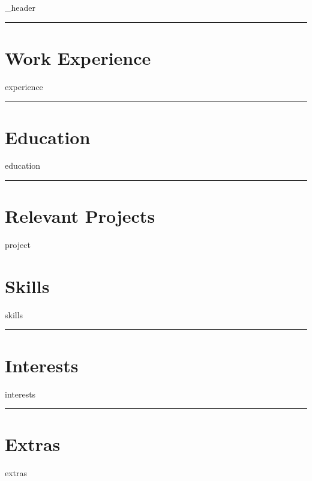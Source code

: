 \documentclass[letter,10pt]{article}
\author{Guilherme Lopes}
\begin{document}
{_header}
\vspace*{10pt}
\hrule


\section{\textbf{Work Experience}}
{experience}
\vspace*{6pt}
\hrule
\section{\textbf{Education}}
{education}
\vspace*{6pt}
\hrule

\section{\textbf{Relevant Projects}}
\vspace*{3pt}
{project}
\vspace*{6pt}

\section{\textbf{Skills}}
\vspace*{3pt}
{skills}
\vspace*{6pt}
\hrule

\section{\textbf{Interests}}
\vspace*{3pt}
{interests}
\vspace*{12pt}
\hrule

\section{\textbf{Extras}}
\vspace*{3pt}
{extras}
\vspace*{6pt}
\end{document}
